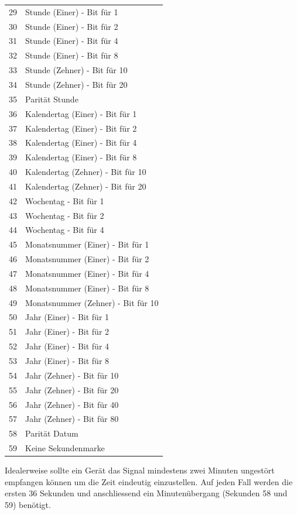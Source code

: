\begin{longtable}{p{0.5cm} p{13.5cm}}
29 & Stunde (Einer) - Bit für 1 \\
30 & Stunde (Einer) - Bit für 2 \\
31 & Stunde (Einer) - Bit für 4 \\
32 & Stunde (Einer) - Bit für 8 \\
33 & Stunde (Zehner) - Bit für 10 \\
34 & Stunde (Zehner) - Bit für 20 \\
35 & Parität Stunde \\ \hline
36 & Kalendertag (Einer) - Bit für 1 \\
37 & Kalendertag (Einer) - Bit für 2 \\
38 & Kalendertag (Einer) - Bit für 4 \\
39 & Kalendertag (Einer) - Bit für 8 \\
40 & Kalendertag (Zehner) - Bit für 10 \\
41 & Kalendertag (Zehner) - Bit für 20 \\
42 & Wochentag - Bit für 1 \\
43 & Wochentag - Bit für 2 \\
44 & Wochentag - Bit für 4 \\
45 & Monatsnummer (Einer) - Bit für 1 \\
46 & Monatsnummer (Einer) - Bit für 2 \\
47 & Monatsnummer (Einer) - Bit für 4 \\
48 & Monatsnummer (Einer) - Bit für 8 \\
49 & Monatsnummer (Zehner) - Bit für 10 \\
50 & Jahr (Einer) - Bit für 1 \\
51 & Jahr (Einer) - Bit für 2 \\
52 & Jahr (Einer) - Bit für 4 \\
53 & Jahr (Einer) - Bit für 8 \\
54 & Jahr (Zehner) - Bit für 10 \\
55 & Jahr (Zehner) - Bit für 20 \\
56 & Jahr (Zehner) - Bit für 40 \\
57 & Jahr (Zehner) - Bit für 80 \\
58 & Parität Datum \\
59 & Keine Sekundenmarke
\end{longtable}

Idealerweise sollte ein Gerät das Signal mindestens zwei Minuten ungestört empfangen können um die Zeit eindeutig einzustellen. Auf jeden Fall werden die ersten 36 Sekunden und anschliessend ein Minutenübergang (Sekunden 58 und 59) benötigt.

